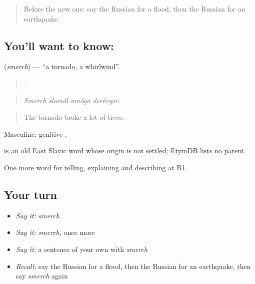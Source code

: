 \label{lesson:RU-C300-smerch}



\begin{quote}
Before the new one: say the Russian for a flood, then the Russian for an earthquake.
\end{quote}

\subsection*{You'll want to know: }
\textbf{} (\emph{smerch}) — \textquotedblleft{}a tornado, a whirlwind\textquotedblright{}.

\begin{quote}
   .
\end{quote}

\begin{quote}
\emph{Smerch slomál mnógo derévyev.}
\end{quote}

\begin{quote}
The tornado broke a lot of trees.
\end{quote}

Masculine; genitive \emph{}.

\begin{cousinweb}
\emph{} is an old East Slavic word whose origin is not settled; EtymDB lists no parent.
\end{cousinweb}

\begin{grammarlens}[title={What you've built}]
One more word for telling, explaining and describing at B1.
\end{grammarlens}

\subsection*{Your turn}
\begin{itemize}
\raggedright
  \item \emph{Say it:} \emph{smerch}
  \item \emph{Say it:} \emph{smerch}, once more
  \item \emph{Say it:} a sentence of your own with \emph{smerch}
  \item \emph{Recall:} say the Russian for a flood, then the Russian for an earthquake, then say \emph{smerch} again
\end{itemize}


